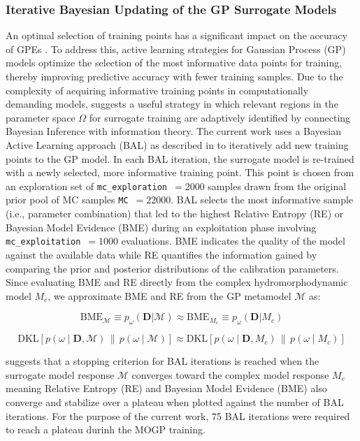 \documentclass[draft,linenumbers,onecolumn]{agujournal2019} %
\begin{document}
\subsubsection{Iterative Bayesian Updating of the GP Surrogate Models}
\label{subsec:sec2.6.3}
An optimal selection of training points has a significant impact on the accuracy of GPEs \cite{sinsbeck2017sequential}. To address this, active learning strategies for Gaussian Process (GP) models optimize the selection of the most informative data points for training, thereby improving predictive accuracy with fewer training samples. Due to the complexity of acquiring informative training points in computationally demanding models,  suggests a useful strategy in which relevant regions in the parameter space \(\Omega\) for surrogate training are adaptively identified by connecting Bayesian Inference with information theory. The current work uses a Bayesian Active Learning approach (BAL) as described in  to iteratively add new training points to the GP model. In each BAL iteration, the surrogate model is re-trained with a newly selected, more informative training point. This point is chosen from an exploration set of \texttt{mc\_exploration}~$= 2000$ samples drawn from the original prior pool of MC samples \texttt{MC}~$= 22000$. BAL selects the most informative sample (i.e., parameter combination) that led to the highest Relative Entropy (RE) or Bayesian Model Evidence (BME) during an exploitation phase involving \texttt{mc\_exploitation}~$= 1000$ evaluations. BME indicates the quality of the model against the available data while RE quantifies the information gained by comparing the prior and posterior distributions of the calibration parameters. Since evaluating BME and RE directly from the complex hydromorphodynamic model \( M_c \), we approximate BME and RE from the GP metamodel \( \mathcal{M} \) as:

\[
\text{BME}_{\mathcal{M}} \equiv p_{\omega}(\mathbf{D}|\mathcal{M}) \approx \text{BME}_{M_c} \equiv p_{\omega}(\mathbf{D}|M_c)
\]

\[
\text{DKL}\left[ p(\omega \mid \mathbf{D}, \mathcal{M}) \,\|\, p(\omega \mid \mathcal{M}) \right] \approx \text{DKL}\left[ p(\omega \mid \mathbf{D}, M_c) \,\|\, p(\omega \mid M_c) \right]
\]

 suggests that a stopping criterion for BAL iterations is reached when the surrogate model response $\mathcal{M}$ converges toward the complex model response $M_c$ meaning Relative Entropy (RE) and Bayesian Model Evidence (BME) also converge and stabilize over a plateau when plotted against the number of BAL iterations. For the purpose of the current work, 75 BAL iterations were required to reach a plateau durinh the MOGP training. 
\end{document}
